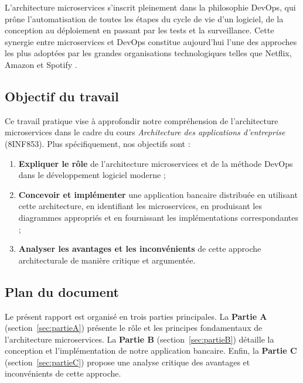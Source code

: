 \documentclass[12pt,a4paper]{article}
\begin{document}
L'architecture microservices s'inscrit pleinement dans la philosophie DevOps, qui prône l'automatisation de toutes les étapes du cycle de vie d'un logiciel, de la conception au déploiement en passant par les tests et la surveillance. Cette synergie entre microservices et DevOps constitue aujourd'hui l'une des approches les plus adoptées par les grandes organisations technologiques telles que Netflix, Amazon et Spotify \cite{newman2021}.

\subsection{Objectif du travail}

Ce travail pratique vise à approfondir notre compréhension de l'architecture microservices dans le cadre du cours \textit{Architecture des applications d'entreprise} (8INF853). Plus spécifiquement, nos objectifs sont :

\begin{enumerate}
    \item \textbf{Expliquer le rôle} de l'architecture microservices et de la méthode DevOps dans le développement logiciel moderne ;
    \item \textbf{Concevoir et implémenter} une application bancaire distribuée en utilisant cette architecture, en identifiant les microservices, en produisant les diagrammes appropriés et en fournissant les implémentations correspondantes ;
    \item \textbf{Analyser les avantages et les inconvénients} de cette approche architecturale de manière critique et argumentée.
\end{enumerate}

\subsection{Plan du document}

Le présent rapport est organisé en trois parties principales. La \textbf{Partie A} (section~\ref{sec:partieA}) présente le rôle et les principes fondamentaux de l'architecture microservices. La \textbf{Partie B} (section~\ref{sec:partieB}) détaille la conception et l'implémentation de notre application bancaire. Enfin, la \textbf{Partie C} (section~\ref{sec:partieC}) propose une analyse critique des avantages et inconvénients de cette approche.

\end{document}
